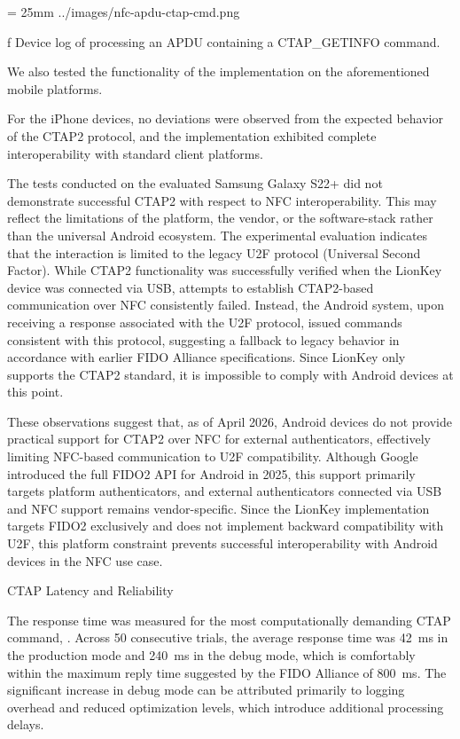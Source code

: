\midinsert
{}
\picheight = 25mm \cinspic ../images/nfc-apdu-ctap-cmd.png
\caption /f Device log of processing an APDU containing a CTAP_GETINFO command.
\endinsert

\leavevmode

\nl We also tested the functionality of the implementation on the aforementioned mobile platforms.

\nl For the iPhone devices, no deviations were observed from the expected behavior of the CTAP2 protocol, and the implementation exhibited complete interoperability with standard client platforms.

\nl The tests conducted on the evaluated Samsung Galaxy S22+ did not demonstrate successful CTAP2 with respect to NFC interoperability. This may reflect the limitations of the platform, the vendor, or the software-stack rather than the universal Android ecosystem. The experimental evaluation indicates that the interaction is limited to the legacy U2F protocol (Universal Second Factor). While CTAP2 functionality was successfully verified when the LionKey device was connected via USB, attempts to establish CTAP2-based communication over NFC consistently failed. Instead, the Android system, upon receiving a response associated with the U2F protocol, issued commands consistent with this protocol, suggesting a fallback to legacy behavior in accordance with earlier FIDO Alliance specifications. Since LionKey only supports the CTAP2 standard, it is impossible to comply with Android devices at this point.

\nl These observations suggest that, as of April 2026, Android devices do not provide practical support for CTAP2 over NFC for external authenticators, effectively limiting NFC-based communication to U2F compatibility. Although Google introduced the full FIDO2 API for Android in 2025, this support primarily targets platform authenticators, and external authenticators connected via USB and NFC support remains vendor-specific. Since the LionKey implementation targets FIDO2 exclusively and does not implement backward compatibility with U2F, this platform constraint prevents successful interoperability with Android devices in the NFC use case.

 CTAP Latency and Reliability

The response time was measured for the most computationally demanding CTAP command, . Across 50 consecutive trials, the average response time was 42~ms in the production mode and 240~ms in the debug mode, which is comfortably within the maximum reply time suggested by the FIDO Alliance of 800~ms. The significant increase in debug mode can be attributed primarily to logging overhead and reduced optimization levels, which introduce additional processing delays. 

